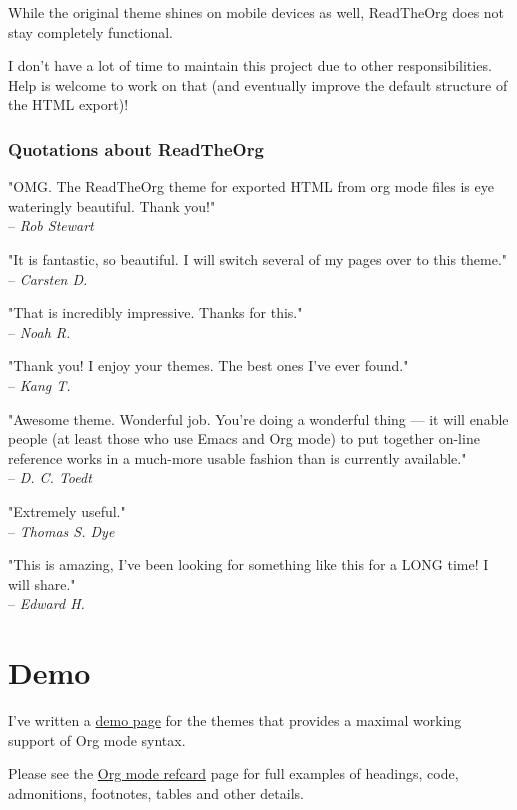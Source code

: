 \documentclass[11pt]{article}
\begin{document}
\begin{note}
While the original theme shines on mobile devices as well, ReadTheOrg does not
stay completely functional.

I don't have a lot of time to maintain this project due to other
responsibilities.  Help is welcome to work on that (and eventually improve the
default structure of the HTML export)!
\end{note}

\subsubsection*{Quotations about ReadTheOrg}
\label{sec:org1b4c328}

"OMG.  The ReadTheOrg theme for exported HTML from org mode files is eye
wateringly beautiful.  Thank you!" \\[0pt]
-- \emph{Rob Stewart}

"It is fantastic, so beautiful.  I will switch several of my pages over to
this theme." \\[0pt]
-- \emph{Carsten D.}

"That is incredibly impressive.  Thanks for this." \\[0pt]
-- \emph{Noah R.}

"Thank you!  I enjoy your themes.  The best ones I've ever found." \\[0pt]
-- \emph{Kang T.}

"Awesome theme.  Wonderful job.  You're doing a wonderful thing --- it will
enable people (at least those who use Emacs and Org mode) to put together
on-line reference works in a much-more usable fashion than is currently
available." \\[0pt]
-- \emph{D. C. Toedt}

"Extremely useful." \\[0pt]
-- \emph{Thomas S. Dye}

"This is amazing, I've been looking for something like this for a LONG time!
I will share." \\[0pt]
-- \emph{Edward H.}

\section{Demo}
\label{sec:org492cf41}

I've written a \href{tests/org-mode-syntax-example.org}{demo page} for the themes that provides a maximal working support
of Org mode syntax.

Please see the \href{https://github.com/fniessen/refcard-org-mode}{Org mode refcard} page for full examples of headings, code,
admonitions, footnotes, tables and other details.
\end{document}
